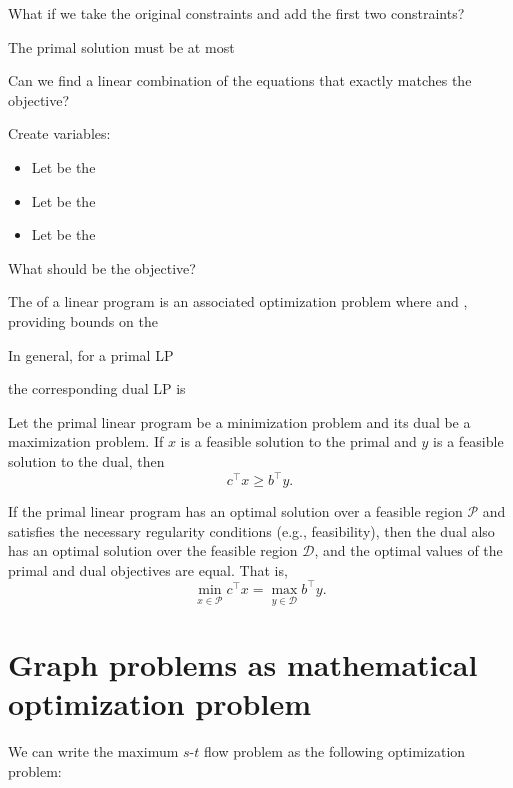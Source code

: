 \documentclass[11  pt]{article}
\begin{document}
\vs{2cm}
What if we take the original constraints and add
the first two constraints?

\vs{2cm}
The primal solution must be at most 

\vs{2cm}
Can we find a linear combination of the equations that exactly matches the objective?

Create variables:
\begin{itemize}
\item
Let  be the 
\item
Let  be the 
\item
Let  be the 
\end{itemize}

\vs{1cm}
What should be the objective?

\vfill
\newpage

The  of a linear program is an associated optimization problem where  and , providing bounds on the 

\vs{1cm}
In general, for a primal LP

\vs{6cm}
the corresponding dual LP is

\vs{6cm}
\begin{theorem}
Let the primal linear program be a minimization problem and its dual be a maximization problem. If \( x \) is a feasible solution to the primal and \( y \) is a feasible solution to the dual, then
\[
c^\top x \geq b^\top y.
\]
\end{theorem}

\begin{theorem}
If the primal linear program has an optimal solution over a feasible region $\mathcal{P}$ and satisfies the necessary regularity conditions (e.g., feasibility), then the dual also has an optimal solution over the feasible region $\mathcal{D}$, and the optimal values of the primal and dual objectives are equal. That is,
\[
\min_{x \in \mathcal{P}} c^\top x = \max_{y \in \mathcal{D}} b^\top y.
\]
\end{theorem}


\newpage
\section{Graph problems as mathematical optimization problem}
We can write the maximum $s$-$t$ flow problem as the following optimization problem:
\end{document}
